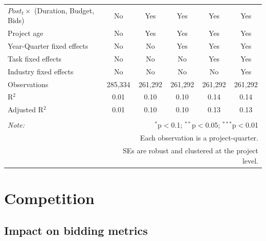 \documentclass[
]{article}
\begin{document}
\begin{table}[H]
\begin{tabular}{@{\extracolsep{-2pt}}lccccc}
$Post_t \times $  (Duration, Budget, Bids) & No & Yes & Yes & Yes & Yes \\ 
Project age & No & Yes & Yes & Yes & Yes \\ 
Year-Quarter fixed effects & No & No & Yes & Yes & Yes \\ 
Task fixed effects & No & No & No & Yes & Yes \\ 
Industry fixed effects & No & No & No & No & Yes \\ 
Observations & 285,334 & 261,292 & 261,292 & 261,292 & 261,292 \\ 
R$^{2}$ & 0.01 & 0.10 & 0.10 & 0.14 & 0.14 \\ 
Adjusted R$^{2}$ & 0.01 & 0.10 & 0.10 & 0.13 & 0.13 \\ 
\hline 
\hline \\[-1.8ex] 
\textit{Note:}  & \multicolumn{5}{r}{$^{*}$p$<$0.1; $^{**}$p$<$0.05; $^{***}$p$<$0.01} \\ 
 & \multicolumn{5}{r}{Each observation is a project-quarter.} \\ 
 & \multicolumn{5}{r}{SEs are robust and clustered at the project level.} \\ 
\end{tabular} 
\end{table}

\hypertarget{competition}{%
\section{Competition}\label{competition}}

\hypertarget{impact-on-bidding-metrics}{%
\subsection{Impact on bidding metrics}\label{impact-on-bidding-metrics}}
\end{document}
